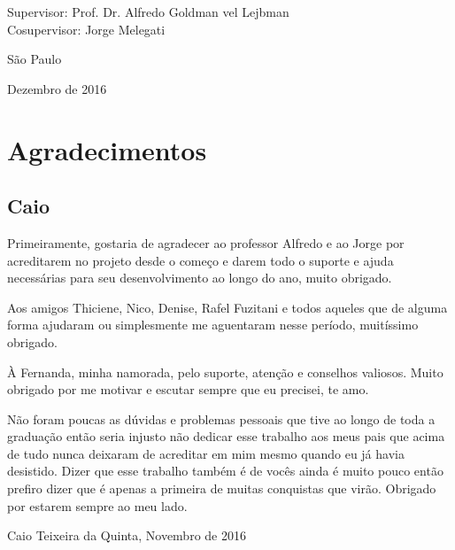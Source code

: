 \documentclass[12pt,twoside,a4paper]{book}
\begin{document}
    \vskip 5cm

    \begin{center}
    Supervisor: Prof. Dr. Alfredo Goldman vel Lejbman\\
    Cosupervisor: Jorge Melegati

    \vskip 5cm
    \normalsize{São Paulo}

    \normalsize{Dezembro de 2016}
    \end{center}
\pagebreak




\chapter*{Agradecimentos}
\section{Caio}
	\par Primeiramente, gostaria de agradecer ao professor Alfredo e ao Jorge por acreditarem no projeto desde o começo e darem todo o suporte e ajuda necessárias para seu desenvolvimento ao longo do ano, muito obrigado.
	\par Aos amigos Thiciene, Nico, Denise, Rafel Fuzitani e todos aqueles que de alguma forma ajudaram ou simplesmente me aguentaram nesse período, muitíssimo obrigado.
	\par À Fernanda, minha namorada, pelo suporte, atenção e conselhos valiosos. Muito obrigado por me motivar e escutar sempre que eu precisei, te amo.
	\par Não foram poucas as dúvidas e problemas pessoais que tive ao longo de toda a graduação então seria injusto não dedicar esse trabalho aos meus pais que acima de tudo nunca deixaram de acreditar em mim mesmo quando eu já havia desistido. Dizer que esse trabalho também é de vocês ainda é muito pouco então prefiro dizer que é apenas a primeira de muitas conquistas que virão. Obrigado por estarem sempre ao meu lado.\\
\begin{flushright}
Caio Teixeira da Quinta, Novembro de 2016
\end{flushright}
\end{document}
